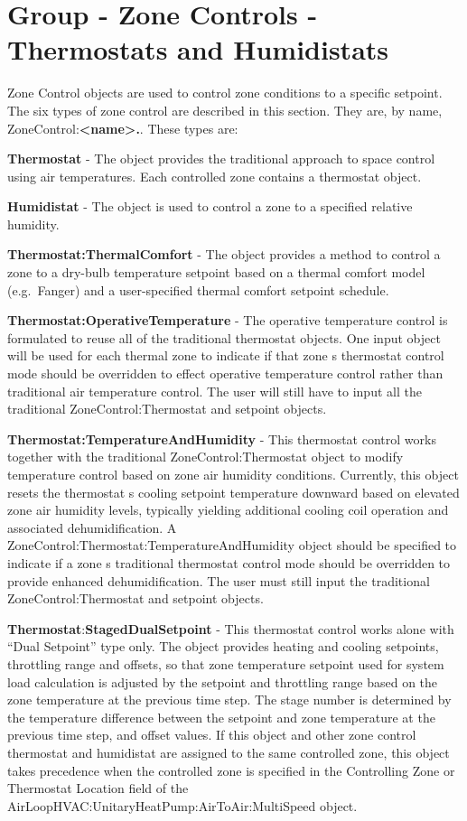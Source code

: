 \section{Group - Zone Controls - Thermostats and Humidistats}\label{group---zone-controls---thermostats-and-humidistats}

Zone Control objects are used to control zone conditions to a specific setpoint. The six types of zone control are described in this section. They are, by name, ZoneControl:\textbf{\textless{}name\textgreater{}.}. These types are:

\textbf{Thermostat} - The object provides the traditional approach to space control using air temperatures. Each controlled zone contains a thermostat object.

\textbf{Humidistat} - The object is used to control a zone to a specified relative humidity.

\textbf{Thermostat:ThermalComfort} - The object provides a method to control a zone to a dry-bulb temperature setpoint based on a thermal comfort model (e.g.~Fanger) and a user-specified thermal comfort setpoint schedule.

\textbf{Thermostat:OperativeTemperature} - The operative temperature control is formulated to reuse all of the traditional thermostat objects. One input object will be used for each thermal zone to indicate if that zone s thermostat control mode should be overridden to effect operative temperature control rather than traditional air temperature control. The user will still have to input all the traditional ZoneControl:Thermostat and setpoint objects.

\textbf{Thermostat:TemperatureAndHumidity} - This thermostat control works together with the traditional ZoneControl:Thermostat object to modify temperature control based on zone air humidity conditions. Currently, this object resets the thermostat s cooling setpoint temperature downward based on elevated zone air humidity levels, typically yielding additional cooling coil operation and associated dehumidification. A ZoneControl:Thermostat:TemperatureAndHumidity object should be specified to indicate if a zone s traditional thermostat control mode should be overridden to provide enhanced dehumidification. The user must still input the traditional ZoneControl:Thermostat and setpoint objects.

\textbf{Thermostat}:\textbf{StagedDualSetpoint} - This thermostat control works alone with ``Dual Setpoint'' type only. The object provides heating and cooling setpoints, throttling range and offsets, so that zone temperature setpoint used for system load calculation is adjusted by the setpoint and throttling range based on the zone temperature at the previous time step. The stage number is determined by the temperature difference between the setpoint and zone temperature at the previous time step, and offset values. If this object and other zone control thermostat and humidistat are assigned to the same controlled zone, this object takes precedence when the controlled zone is specified in the Controlling Zone or Thermostat Location field of the AirLoopHVAC:UnitaryHeatPump:AirToAir:MultiSpeed object.

